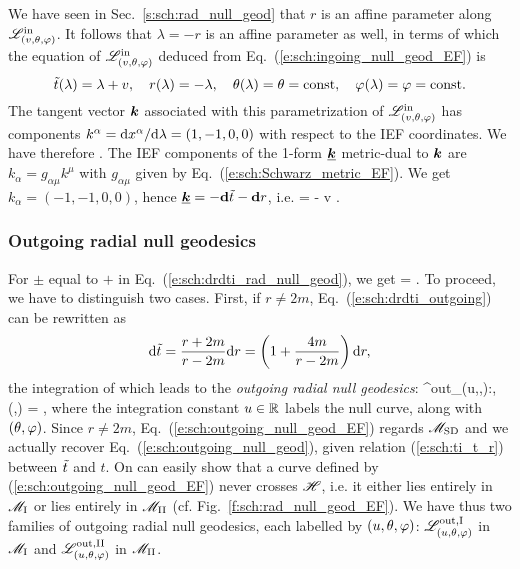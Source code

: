 We have seen in Sec.~\ref{s:sch:rad_null_geod} that $r$ is an affine parameter
along $\mathscr{L}^{\rm in}_{(v,\theta,\varphi)}$. It follows that $\lambda = -r$ is an
affine parameter as well, in terms of which the equation of $\mathscr{L}^{\rm in}_{(v,\theta,\varphi)}$
deduced from Eq.~(\ref{e:sch:ingoing_null_geod_EF}) is
\[
    {\tilde t}(\lambda) = \lambda + v, \quad r(\lambda) = - \lambda, \quad
    \theta(\lambda) = \theta = \mathrm{const},\quad \varphi(\lambda) = \varphi = \mathrm{const}.
\]
The tangent vector $\bm{k}$ associated with this parametrization of $\mathscr{L}^{\rm in}_{(v,\theta,\varphi)}$
has components
$k^\alpha = \mathrm{d} x^\alpha/\mathrm{d}\lambda = (1, -1, 0, 0)$
with respect to the IEF coordinates. We have therefore
\be \label{e:sch:null_vector_k}
   .
\ee
The IEF components of the 1-form $\underline{\bm{k}}$ metric-dual to $\bm{k}$ are
$k_\alpha = g_{\alpha\mu} k^\mu$ with $g_{\alpha\mu}$ given by Eq.~(\ref{e:sch:Schwarz_metric_EF}).
We get $k_\alpha = (-1,-1,0,0)$, hence $\underline{\bm{k}} = - \mathbf{d} {\tilde t} - \mathbf{d} r$, i.e.
\be
     = - \dd v .
\ee

\subsubsection{Outgoing radial null geodesics}

For $\pm$ equal to $+$ in Eq.~(\ref{e:sch:drdti_rad_null_geod}), we get
\be \label{e:sch:drdti_outgoing}
     = .
\ee
To proceed, we have to distinguish two cases.
First, if $r\neq 2m$, Eq.~(\ref{e:sch:drdti_outgoing}) can be rewritten as
\[
    \mathrm{d} {\tilde t} = \frac{r + 2m}{r - 2m} \mathrm{d} r  = \left( 1 + \frac{4m}{r - 2m} \right) \mathrm{d} r,
\]
the integration of which leads to the \emph{outgoing radial null geodesics}:
\be \label{e:sch:outgoing_null_geod_EF}
     \Li^{\rm out}_{(u,\th,\ph)}:\quad  {},
    \quad (\th,\ph) = ,
\ee
where the integration constant $u\in \mathbb{R}$ labels the null curve, along with $(\theta,\varphi)$.
Since $r\neq 2m$, Eq.~(\ref{e:sch:outgoing_null_geod_EF}) regards $\mathscr{M}_{\rm SD}$
and we actually recover Eq.~(\ref{e:sch:outgoing_null_geod}),
given relation (\ref{e:sch:ti_t_r}) between ${\tilde t}$ and $t$. On can easily show
that a curve defined by (\ref{e:sch:outgoing_null_geod_EF}) never crosses $\mathscr{H}$, i.e.
it either lies entirely in $\mathscr{M}_{\rm I}$ or lies entirely in $\mathscr{M}_{\rm II}$
(cf. Fig.~\ref{f:sch:rad_null_geod_EF}). We have thus
two families of outgoing radial null geodesics, each labelled by $(u,\theta,\varphi)$:
$\mathscr{L}^{\rm out,I}_{(u,\theta,\varphi)}$ in $\mathscr{M}_{\rm I}$ and
$\mathscr{L}^{\rm out,II}_{(u,\theta,\varphi)}$ in $\mathscr{M}_{\rm II}$.

